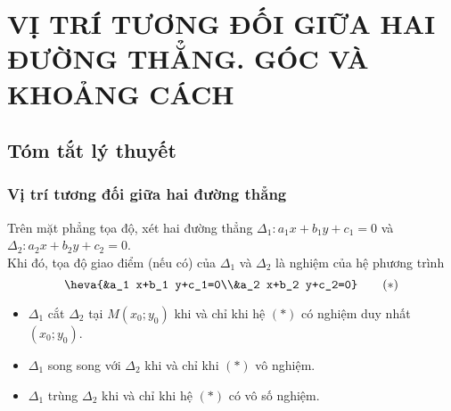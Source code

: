 \newpage\setcounter{dang}{0}
\section{VỊ TRÍ TƯƠNG ĐỐI GIỮA HAI ĐƯỜNG THẲNG. GÓC VÀ KHOẢNG CÁCH}
\subsection{Tóm tắt lý thuyết}
\subsubsection{Vị trí tương đối giữa hai đường thẳng}
	Trên mặt phẳng tọa độ, xét hai đường thẳng $\Delta_1 \colon a_1 x+b_1 y+c_1=0$ và $\Delta_2 \colon a_2 x+b_2 y+c_2=0$.\\
	Khi đó, tọa độ giao điểm (nếu có) của $\Delta_1$ và $\Delta_2$ là nghiệm của hệ phương trình
	$$\heva{&a_1 x+b_1 y+c_1=0\\&a_2 x+b_2 y+c_2=0}\qquad(*)$$
	\begin{itemize}
		\item $\Delta_1$ cắt $\Delta_2$ tại $M(x_0;y_0)$ khi và chỉ khi hệ $(*)$ có nghiệm duy nhất $(x_0;y_0)$.
		\item $\Delta_1$ song song với $\Delta_2$ khi và chỉ khi $(*)$ vô nghiệm.
		\item $\Delta_1$ trùng $\Delta_2$ khi và chỉ khi hệ $(*)$ có vô số nghiệm.
	\end{itemize}
